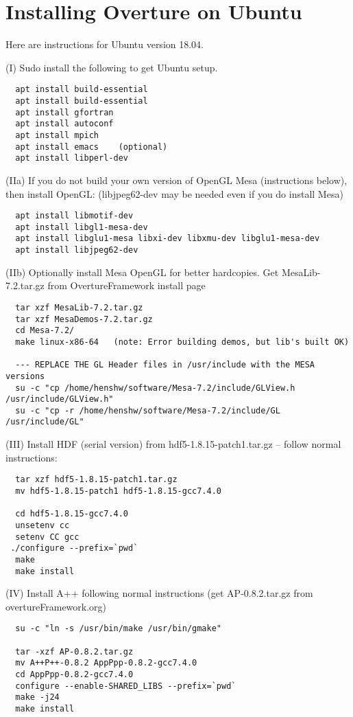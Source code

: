 \section{Installing Overture on Ubuntu}  \label{sec:installUbuntu}


Here are instructions for Ubuntu version 18.04.

\bigskip\noindent
(I) Sudo install the following to get Ubuntu setup.
\begin{verbatim}
  apt install build-essential
  apt install build-essential
  apt install gfortran
  apt install autoconf
  apt install mpich
  apt install emacs    (optional)
  apt install libperl-dev
\end{verbatim}

\bigskip\noindent
(IIa) If you do not build your own version of OpenGL Mesa (instructions below),  then 
install OpenGL: (libjpeg62-dev may be needed even if you do install Mesa)
\begin{verbatim}
  apt install libmotif-dev
  apt install libgl1-mesa-dev
  apt install libglu1-mesa libxi-dev libxmu-dev libglu1-mesa-dev
  apt install libjpeg62-dev
\end{verbatim}

\noindent
(IIb) Optionally install Mesa OpenGL for better hardcopies.
Get MesaLib-7.2.tar.gz from OvertureFramework install page
\begin{verbatim}
  tar xzf MesaLib-7.2.tar.gz
  tar xzf MesaDemos-7.2.tar.gz
  cd Mesa-7.2/
  make linux-x86-64   (note: Error building demos, but lib's built OK) 

  --- REPLACE THE GL Header files in /usr/include with the MESA versions
  su -c "cp /home/henshw/software/Mesa-7.2/include/GLView.h /usr/include/GLView.h"
  su -c "cp -r /home/henshw/software/Mesa-7.2/include/GL /usr/include/GL"  
\end{verbatim}



\bigskip\noindent
(III) Install HDF (serial version) from hdf5-1.8.15-patch1.tar.gz -- follow normal instructions:
\begin{verbatim}
  tar xzf hdf5-1.8.15-patch1.tar.gz
  mv hdf5-1.8.15-patch1 hdf5-1.8.15-gcc7.4.0

  cd hdf5-1.8.15-gcc7.4.0
  unsetenv cc
  setenv CC gcc
 ./configure --prefix=`pwd` 
  make
  make install
\end{verbatim}

\bigskip\noindent
(IV) Install A++ following normal instructions (get AP-0.8.2.tar.gz from overtureFramework.org)
\begin{verbatim}
  su -c "ln -s /usr/bin/make /usr/bin/gmake"

  tar -xzf AP-0.8.2.tar.gz
  mv A++P++-0.8.2 AppPpp-0.8.2-gcc7.4.0
  cd AppPpp-0.8.2-gcc7.4.0
  configure --enable-SHARED_LIBS --prefix=`pwd`
  make -j24
  make install
\end{verbatim}

